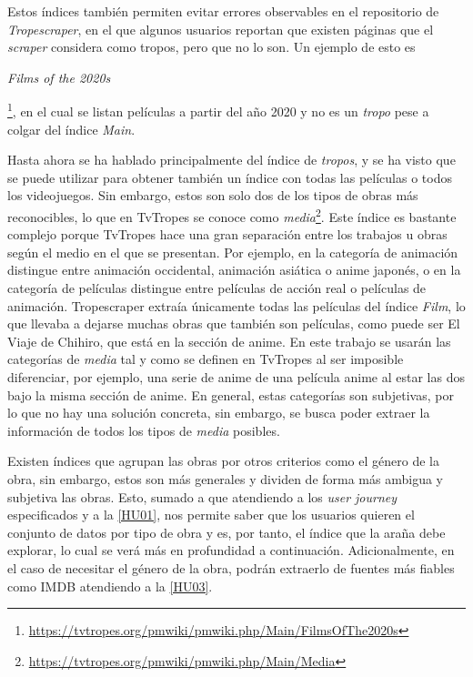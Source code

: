 Estos índices también permiten evitar errores observables en el repositorio de
\textit{Tropescraper}, en el que algunos usuarios reportan que existen páginas
que el \textit{scraper} considera como tropos, pero que no lo son. Un ejemplo de
esto es \begin{otherlanguage}{english}\textit{Films of the
2020s}\end{otherlanguage}\footnote{\url{https://tvtropes.org/pmwiki/pmwiki.php/Main/FilmsOfThe2020s}},
en el cual se listan películas a partir del año 2020 y no es un \textit{tropo}
pese a colgar del índice \textit{Main}.

Hasta ahora se ha hablado principalmente del índice de \textit{tropos}, y se ha
visto que se puede utilizar para obtener también un índice con todas las
películas o todos los videojuegos. Sin embargo, estos son solo dos de los tipos
de obras más reconocibles, lo que en TvTropes se conoce como
\textit{media}\footnote{\url{https://tvtropes.org/pmwiki/pmwiki.php/Main/Media}}.
Este índice es bastante complejo porque TvTropes hace una gran separación entre
los trabajos u obras según el medio en el que se presentan. Por ejemplo, en la
categoría de animación distingue entre animación occidental, animación asiática
o anime japonés, o en la categoría de películas distingue entre películas de
acción real o películas de animación. Tropescraper extraía únicamente todas las
películas del índice \textit{Film}, lo que llevaba a dejarse muchas obras que
también son películas, como puede ser El Viaje de Chihiro, que está en la
sección de anime. En este trabajo se usarán las categorías de \textit{media} tal
y como se definen en TvTropes al ser imposible diferenciar, por ejemplo, una
serie de anime de una película anime al estar las dos bajo la misma sección de
anime. En general, estas categorías son subjetivas, por lo que no hay una
solución concreta, sin embargo, se busca poder extraer la información de todos
los tipos de \textit{media} posibles.

Existen índices que agrupan las obras por otros criterios como el género de la
obra, sin embargo, estos son más generales y dividen de forma más ambigua y
subjetiva las obras. Esto, sumado a que atendiendo a los \textit{user journey}
especificados y a la
\href{https://github.com/jlgallego99/TropesToGo/issues/6}{[HU01]}, nos permite
saber que los usuarios quieren el conjunto de datos por tipo de obra y es, por
tanto, el índice que la araña debe explorar, lo cual se verá más en profundidad
a continuación. Adicionalmente, en el caso de necesitar el género de la obra,
podrán extraerlo de fuentes más fiables como IMDB atendiendo a la
\href{https://github.com/jlgallego99/TropesToGo/issues/8}{[HU03]}.

